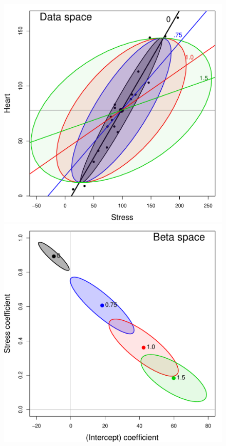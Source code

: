 \begin{figure}[htb]
 \begin{minipage}[b]{.49\linewidth}
  \centering
  \includegraphics[width=1\linewidth]{fig/coffee-stress1}
 \end{minipage}%
 \hfill
 \begin{minipage}[b]{.49\linewidth}
  \centering
  \includegraphics[width=1\linewidth]{fig/coffee-stress2}

\end{minipage}
\end{figure}
